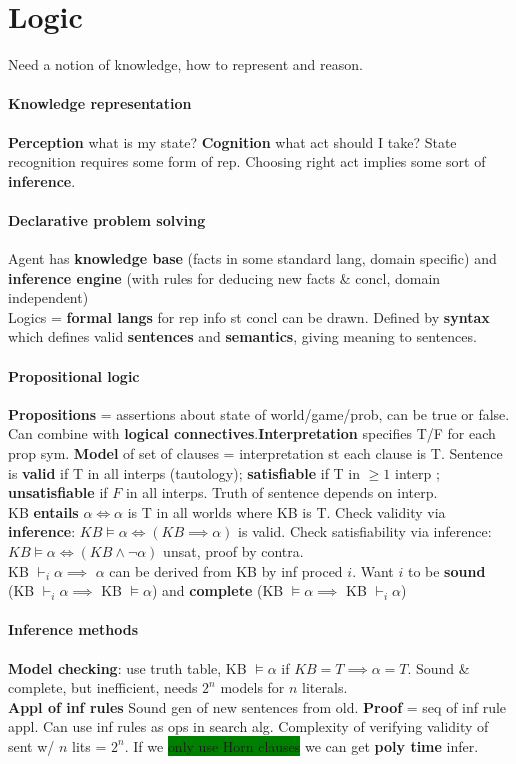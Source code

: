 \section{Logic} Need a notion of knowledge, how to represent and
reason.
\paragraph{Knowledge representation} \textbf{Perception} what is my
state? \textbf{Cognition} what act should I take? State recognition
requires some form of rep. Choosing right act implies
some sort of \textbf{inference}.
\paragraph{Declarative problem solving} Agent has \textbf{knowledge
  base} (facts in some standard lang, domain specific) and \textbf{inference engine}
(with rules for deducing new facts \& concl, domain independent)
\\ Logics = \textbf{formal langs} for rep info st concl can
be drawn. Defined by \textbf{syntax} which defines valid
\textbf{sentences} and \textbf{semantics}, giving meaning to
sentences.
\paragraph{Propositional logic} \textbf{Propositions} = assertions
about state of world/game/prob, can be true or false. Can combine with
\textbf{logical connectives}.\textbf{Interpretation} specifies T/F for
each prop sym. \textbf{Model} of set of clauses = interpretation st
each clause is T. Sentence is \textbf{valid} if T in all interps
(tautology); \textbf{satisfiable} if T in $\geq 1$ interp ;
\textbf{unsatisfiable} if $F$ in all interps. Truth of sentence
depends on interp.
\\ KB \textbf{entails} $\alpha \iff \alpha$ is T in all worlds where
KB is T. Check validity via \textbf{inference}: $KB \models \alpha
\iff (KB \implies \alpha)$ is valid. Check satisfiability via
inference: $KB \models \alpha \iff (KB \land \neg \alpha)$ unsat,
proof by contra.
\\ KB $\vdash_i\alpha \implies$ $\alpha$ can be derived from KB by inf
proced $i$. Want $i$ to be \textbf{sound} (KB $\vdash_i \alpha
\implies $ KB $\models \alpha$) and \textbf{complete} (KB $\models
\alpha \implies$ KB $\vdash_i \alpha$)
\paragraph{Inference methods}
\textbf{Model checking}: use truth table, KB $\models \alpha$ if
$KB = T \implies \alpha = T$. Sound \& complete, but inefficient,
needs $2^n$ models for $n$ literals.
\\ \textbf{Appl of inf rules} Sound gen of new sentences from
old. \textbf{Proof} = seq of inf rule appl. Can use inf rules as ops
in search alg. Complexity of verifying validity of sent w/ $n$ lits =
$2^n$. If we \colorbox{green}{only use Horn clauses} we can get \textbf{poly time} infer.
